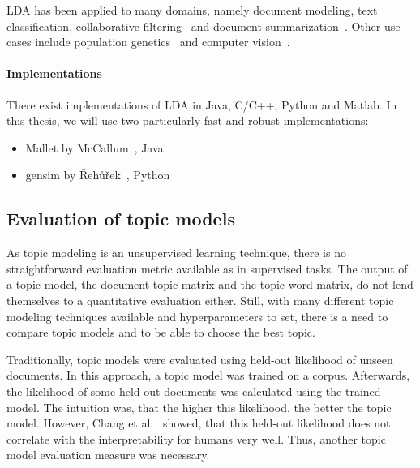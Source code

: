 \documentclass[
        a4paper,
        titlepage,
        twoside,
        parskip
        ]{scrbook}
\theoremstyle{break}
\begin{document}
LDA has been applied to many domains, namely document modeling, text classification, collaborative filtering~\cite{Blei2003} and document summarization~\cite{Wang2009}.
Other use cases include population genetics~\cite{Pritchard2000} and computer vision~\cite{LiFei-Fei2005}.

\paragraph{Implementations}
There exist implementations of LDA in Java, C/C++, Python and Matlab.
In this thesis, we will use two particularly fast and robust implementations:
\begin{itemize}
       \item Mallet by McCallum~\cite{McCallum2002}, Java
       \item gensim by {\v R}eh{\r u}{\v r}ek~\cite{Rehurek2010}, Python
\end{itemize}


\subsection{Evaluation of topic models}
\label{sec:evaluation_of_topic_models}
As topic modeling is an unsupervised learning technique, there is no straightforward evaluation metric available as in supervised tasks.
The output of a topic model, the document-topic matrix and the topic-word matrix, do not lend themselves to a quantitative evaluation either.
Still, with many different topic modeling techniques available and hyperparameters to set, there is a need to compare topic models and to be able to choose the best topic.

Traditionally, topic models were evaluated using held-out likelihood of unseen documents.
In this approach, a topic model was trained on a corpus.
Afterwards, the likelihood of some held-out documents was calculated using the trained model.
The intuition was, that the higher this likelihood, the better the topic model.
However, Chang et al.~\cite{Chang2009} showed, that this held-out likelihood does not correlate with the interpretability for humans very well.
Thus, another topic model evaluation measure was necessary.
\end{document}
